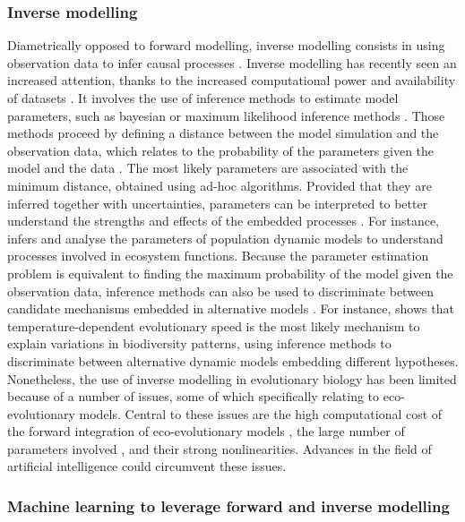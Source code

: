 \subsubsection*{Inverse modelling}
Diametrically opposed to forward modelling, inverse modelling consists in using observation data to infer causal processes \cite{Peng2011}. Inverse modelling has recently seen an increased attention, thanks to the increased computational power and availability of datasets \cite{Csillery2010}.
% 
It involves the use of inference methods to estimate model parameters, such as bayesian or maximum likelihood inference methods \cite{Schartau2017}. Those methods proceed by defining a distance between the model simulation and the observation data, which relates to the probability of the parameters given the model and the data \cite{Schartau2017}. The most likely parameters are associated with the minimum distance, obtained using ad-hoc algorithms.
% 
Provided that they are inferred together with uncertainties, parameters can be interpreted to better understand the strengths and effects of the embedded processes \cite{Pontarp2019}. For instance, \cite{Higgins2010,Curtsdotter2019} infers and analyse the parameters of population dynamic models to understand processes involved in ecosystem functions.
%
Because the parameter estimation problem is equivalent to finding the maximum probability of the model given the observation data, inference methods can also be used to discriminate between candidate mechanisms embedded in alternative models \cite{Burnham2002,Johnson2004}. For instance, \cite{Skeels2022} shows that temperature-dependent evolutionary speed is the most likely mechanism to explain variations in biodiversity patterns, using inference methods to discriminate between alternative dynamic models embedding different hypotheses.
% 
Nonetheless, the use of inverse modelling in evolutionary biology has been limited because of a number of issues, some of which specifically relating to eco-evolutionary models. Central to these issues are the high computational cost of the forward integration of eco-evolutionary models \cite{Fisher2018}, the large number of parameters involved \cite{Boyd2012}, and their strong nonlinearities\cite{Hastings1993,Huisman1999,Beninca2008}. Advances in the field of artificial intelligence could circumvent these issues.

\subsubsection*{Machine learning to leverage forward and inverse modelling}


